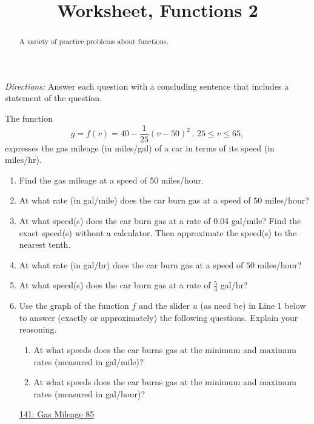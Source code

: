 \documentclass{ximera}
\title{Worksheet, Functions 2}
\begin{document}
\begin{abstract}
A variety of practice problems about functions.
\end{abstract}
\maketitle


 
\emph{Directions:} Answer each question with a concluding sentence that includes a statement of the question.

\begin{question} \label{Q0fe09efr}
The function 
\[
  g = f(v) = 40 - \frac{1}{25} \left( v - 50 \right)^2 \, , \, 25 \leq v \leq 65,
\]
expresses the gas mileage (in miles/gal) of a car in terms of its speed (in miles/hr). 

\begin{enumerate}
\item Find the gas mileage at a speed of $50$ miles/hour.

\item At what rate (in gal/mile) does the car burn gas at a speed of $50$ miles/hour?

\item At what speed(s) does the car burn gas at a rate of 0.04 gal/mile? Find the exact speed(s) without a calculator. Then approximate the speed(s) to the nearest tenth.

\item At what rate (in gal/hr) does the car burn gas at a speed of $50$ miles/hour?

\item At what speed(s) does the car burn gas at a rate of $\frac{5}{3}$ gal/hr?

\item Use the graph of the function $f$ and the slider $u$ (as need be) in Line 1 below to answer (exactly or approximately) the following questions. Explain your reasoning.

\begin{enumerate}
\item At what speeds does the car burns gas at the minimum and maximum rates (measured in gal/mile)?
\item  At what speeds does the car burns gas at the minimum and maximum rates (measured in gal/hour)?
\end{enumerate}


\begin{onlineOnly}
   \begin{center}
\end{center}
\end{onlineOnly}

\href{https://www.desmos.com/calculator/kbnlgl9cl7}{141: Gas Mileage 85}

\end{enumerate}
\end{question}
\end{document}
